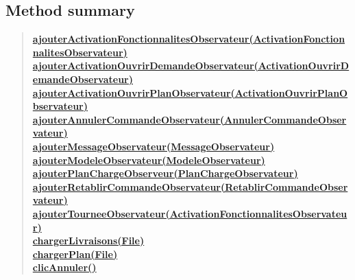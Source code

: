 \documentclass[11pt,a4paper]{report}
\begin{document}
{{{{\subsection{Method summary}{
\begin{verse}
\hyperlink{controleur.Controleur.ajouterActivationFonctionnalitesObservateur(controleur.observateur.ActivationFonctionnalitesObservateur)}{{\bf ajouterActivationFonctionnalitesObservateur(ActivationFonctionnalitesObservateur)}} \\
\hyperlink{controleur.Controleur.ajouterActivationOuvrirDemandeObservateur(controleur.observateur.ActivationOuvrirDemandeObservateur)}{{\bf ajouterActivationOuvrirDemandeObservateur(ActivationOuvrirDemandeObservateur)}} \\
\hyperlink{controleur.Controleur.ajouterActivationOuvrirPlanObservateur(controleur.observateur.ActivationOuvrirPlanObservateur)}{{\bf ajouterActivationOuvrirPlanObservateur(ActivationOuvrirPlanObservateur)}} \\
\hyperlink{controleur.Controleur.ajouterAnnulerCommandeObservateur(controleur.observateur.AnnulerCommandeObservateur)}{{\bf ajouterAnnulerCommandeObservateur(AnnulerCommandeObservateur)}} \\
\hyperlink{controleur.Controleur.ajouterMessageObservateur(controleur.observateur.MessageObservateur)}{{\bf ajouterMessageObservateur(MessageObservateur)}} \\
\hyperlink{controleur.Controleur.ajouterModeleObservateur(controleur.observateur.ModeleObservateur)}{{\bf ajouterModeleObservateur(ModeleObservateur)}} \\
\hyperlink{controleur.Controleur.ajouterPlanChargeObserveur(controleur.observateur.PlanChargeObservateur)}{{\bf ajouterPlanChargeObserveur(PlanChargeObservateur)}} \\
\hyperlink{controleur.Controleur.ajouterRetablirCommandeObservateur(controleur.observateur.RetablirCommandeObservateur)}{{\bf ajouterRetablirCommandeObservateur(RetablirCommandeObservateur)}} \\
\hyperlink{controleur.Controleur.ajouterTourneeObservateur(controleur.observateur.ActivationFonctionnalitesObservateur)}{{\bf ajouterTourneeObservateur(ActivationFonctionnalitesObservateur)}} \\
\hyperlink{controleur.Controleur.chargerLivraisons(java.io.File)}{{\bf chargerLivraisons(File)}} \\
\hyperlink{controleur.Controleur.chargerPlan(java.io.File)}{{\bf chargerPlan(File)}} \\
\hyperlink{controleur.Controleur.clicAnnuler()}{{\bf clicAnnuler()}} \\

\end{verse}}}}}}
\end{document}
